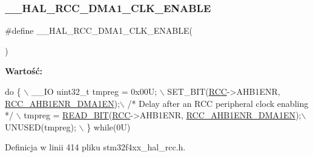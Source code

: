 \subsubsection{\texorpdfstring{\+\_\+\+\_\+\+H\+A\+L\+\_\+\+R\+C\+C\+\_\+\+D\+M\+A1\+\_\+\+C\+L\+K\+\_\+\+E\+N\+A\+B\+LE}{\_\_HAL\_RCC\_DMA1\_CLK\_ENABLE}}
{\footnotesize\ttfamily \#define \+\_\+\+\_\+\+H\+A\+L\+\_\+\+R\+C\+C\+\_\+\+D\+M\+A1\+\_\+\+C\+L\+K\+\_\+\+E\+N\+A\+B\+LE(\begin{DoxyParamCaption}{ }\end{DoxyParamCaption})}

{\bfseries Wartość\+:}
\begin{DoxyCode}
\textcolor{keywordflow}{do} \{ \(\backslash\)
                                        \_\_IO uint32\_t tmpreg = 0x00U; \(\backslash\)
                                        SET\_BIT(\hyperlink{group___peripheral__declaration_ga74944438a086975793d26ae48d5882d4}{RCC}->AHB1ENR, 
      \hyperlink{group___peripheral___registers___bits___definition_gae07b00778a51a4e52b911aeccb897aba}{RCC\_AHB1ENR\_DMA1EN});\(\backslash\)
                                        \textcolor{comment}{/* Delay after an RCC peripheral clock enabling */} \(\backslash\)
                                        tmpreg = \hyperlink{group___exported__macro_ga822bb1bb9710d5f2fa6396b84e583c33}{READ\_BIT}(\hyperlink{group___peripheral__declaration_ga74944438a086975793d26ae48d5882d4}{RCC}->AHB1ENR, 
      \hyperlink{group___peripheral___registers___bits___definition_gae07b00778a51a4e52b911aeccb897aba}{RCC\_AHB1ENR\_DMA1EN});\(\backslash\)
                                        UNUSED(tmpreg); \(\backslash\)
                                         \} \textcolor{keywordflow}{while}(0U)
\end{DoxyCode}


Definicja w linii 414 pliku stm32f4xx\+\_\+hal\+\_\+rcc.\+h.

\mbox{\label{group___r_c_c___a_h_b1___clock___enable___disable_gaa97383d7ee14e9a638eb8c9ba35658f0}} 
